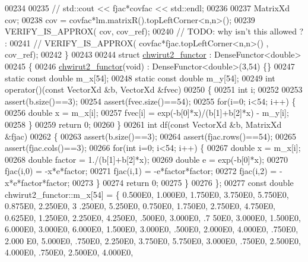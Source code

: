 \begin{DoxyCode}
00234 
00235 \textcolor{comment}{//  std::cout << fjac*covfac << std::endl;}
00236 
00237   MatrixXd cov;
00238   cov =  covfac*lm.matrixR().topLeftCorner<n,n>();
00239   VERIFY\_IS\_APPROX( cov, cov\_ref);
00240   \textcolor{comment}{// TODO: why isn't this allowed ? :}
00241   \textcolor{comment}{// VERIFY\_IS\_APPROX( covfac*fjac.topLeftCorner<n,n>() , cov\_ref);}
00242 \}
00243 
00244 \textcolor{keyword}{struct }\hyperlink{structchwirut2__functor}{chwirut2\_functor} : DenseFunctor<double>
00245 \{
00246     \hyperlink{structchwirut2__functor}{chwirut2\_functor}(\textcolor{keywordtype}{void}) : DenseFunctor<double>(3,54) \{\}
00247     \textcolor{keyword}{static} \textcolor{keyword}{const} \textcolor{keywordtype}{double} m\_x[54];
00248     \textcolor{keyword}{static} \textcolor{keyword}{const} \textcolor{keywordtype}{double} m\_y[54];
00249     \textcolor{keywordtype}{int} operator()(\textcolor{keyword}{const} VectorXd &b, VectorXd &fvec)
00250     \{
00251         \textcolor{keywordtype}{int} i;
00252 
00253         assert(b.size()==3);
00254         assert(fvec.size()==54);
00255         \textcolor{keywordflow}{for}(i=0; i<54; i++) \{
00256             \textcolor{keywordtype}{double} x = m\_x[i];
00257             fvec[i] = exp(-b[0]*x)/(b[1]+b[2]*x) - m\_y[i];
00258         \}
00259         \textcolor{keywordflow}{return} 0;
00260     \}
00261     \textcolor{keywordtype}{int} df(\textcolor{keyword}{const} VectorXd &b, MatrixXd &fjac)
00262     \{
00263         assert(b.size()==3);
00264         assert(fjac.rows()==54);
00265         assert(fjac.cols()==3);
00266         \textcolor{keywordflow}{for}(\textcolor{keywordtype}{int} i=0; i<54; i++) \{
00267             \textcolor{keywordtype}{double} x = m\_x[i];
00268             \textcolor{keywordtype}{double} factor = 1./(b[1]+b[2]*x);
00269             \textcolor{keywordtype}{double} e = exp(-b[0]*x);
00270             fjac(i,0) = -x*e*factor;
00271             fjac(i,1) = -e*factor*factor;
00272             fjac(i,2) = -x*e*factor*factor;
00273         \}
00274         \textcolor{keywordflow}{return} 0;
00275     \}
00276 \};
00277 \textcolor{keyword}{const} \textcolor{keywordtype}{double} chwirut2\_functor::m\_x[54] = \{ 0.500E0, 1.000E0, 1.750E0, 3.750E0, 5.750E0, 0.875E0, 2.250E0, 3
      .250E0, 5.250E0, 0.750E0, 1.750E0, 2.750E0, 4.750E0, 0.625E0, 1.250E0, 2.250E0, 4.250E0, .500E0, 3.000E0, .7
      50E0, 3.000E0, 1.500E0, 6.000E0, 3.000E0, 6.000E0, 1.500E0, 3.000E0, .500E0, 2.000E0, 4.000E0, .750E0, 2.000
      E0, 5.000E0, .750E0, 2.250E0, 3.750E0, 5.750E0, 3.000E0, .750E0, 2.500E0, 4.000E0, .750E0, 2.500E0, 4.000E0,

\end{DoxyCode}

